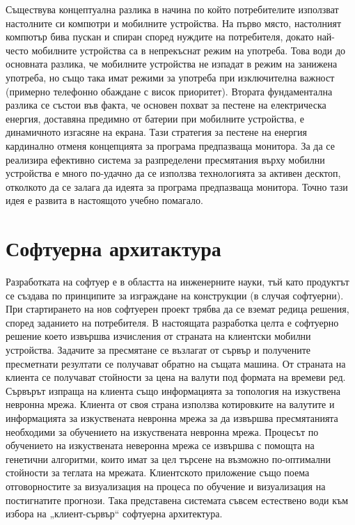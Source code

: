 \documentclass[book,14pt,oneside,openany]{memoir}
\begin{document}
Съществува концептуална разлика в начина по който потребителите използват настолните си компютри и мобилните устройства. На първо място, настолният компютър бива пускан и спиран според нуждите на потребителя, докато най-често мобилните устройства са в непрекъснат режим на употреба. Това води до основната разлика, че мобилните устройства не изпадат в режим на занижена употреба, но също така имат режими за употреба при изключителна важност (примерно телефонно обаждане с висок приоритет). Втората фундаментална разлика се състои във факта, че основен похват за пестене на електрическа енергия, доставяна предимно от батерии при мобилните устройства, е динамичното изгасяне на екрана. Тази стратегия за пестене на енергия кардинално отменя концепцията за програма предпазваща монитора. За да се реализира ефективно система за разпределени пресмятания върху мобилни устройства е много по-удачно да се използва технологията за активен десктоп, отколкото да се залага да идеята за програма предпазваща монитора. Точно тази идея е развита в настоящото учебно помагало. 

\newpage
\chapter{Софтуерна архитактура}

Разработката на софтуер е в областта на инженерните науки, тъй като продуктът се създава по принципите за изграждане на конструкции (в случая софтуерни). При стартирането на нов софтуерен проект трябва да се вземат редица решения, според заданието на потребителя. В настоящата разработка целта е софтуерно решение което извършва изчисления от страната на клиентски мобилни устройства. Задачите за пресмятане се възлагат от сървър и получените пресметнати резултати се получават обратно на същата машина. От страната на клиента се получават стойности за цена на валути под формата на времеви ред. Сървърът изпраща на клиента също информацията за топология на изкуствена невронна мрежа. Клиента от своя страна използва котировките на валутите и информацията за изкуствената невронна мрежа за да извършва пресмятанията необходими за обучението на изкуствената невронна мрежа. Процесът по обучението на изкуствената неверонна мрежа се извършва с помощта на генетични алгоритми, които имат за цел търсене на възможно по-оптимални стойности за теглата на мрежата. Клиентското приложение също поема отговорностите за визуализация на процеса по обучение и визуализация на постигнатите прогнози. Така представена системата съвсем естествено води към избора на „клиент-сървър“ софтуерна архитектура. 
\end{document}
